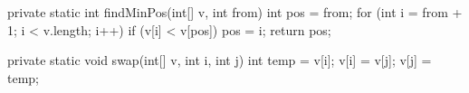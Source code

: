 \begin{unipdcode}[language=Java]
private static int findMinPos(int[] v, int from) {
    int pos = from;
    for (int i = from + 1; i < v.length; i++)
        if (v[i] < v[pos]) pos = i;
    return pos;
}

private static void swap(int[] v, int i, int j) {
    int temp = v[i];
    v[i] = v[j];
    v[j] = temp;
}
\end{unipdcode}
